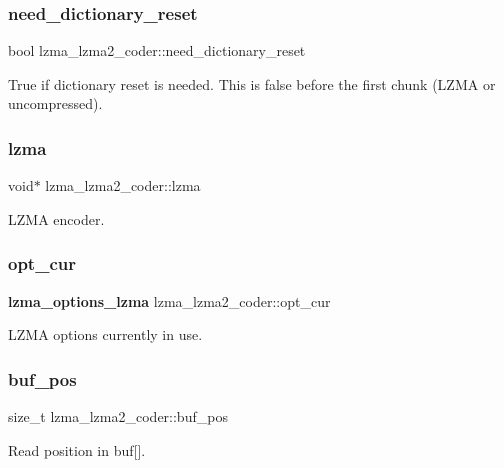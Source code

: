 \subsubsection{need\+\_\+dictionary\+\_\+reset}
{\footnotesize\ttfamily bool lzma\+\_\+lzma2\+\_\+coder\+::need\+\_\+dictionary\+\_\+reset}

True if dictionary reset is needed. This is false before the first chunk (L\+Z\+MA or uncompressed). \mbox{\label{structlzma__lzma2__coder_a9b7cc5edf67bc4bd89794a0e4f215d33}} 
\subsubsection{lzma\hspace{0.1cm}{\footnotesize\ttfamily [2/2]}}
{\footnotesize\ttfamily void$\ast$ lzma\+\_\+lzma2\+\_\+coder\+::lzma}



L\+Z\+MA encoder. 

\mbox{\label{structlzma__lzma2__coder_a83064090ed5b39899716c9e0a519098a}} 
\subsubsection{opt\+\_\+cur}
{\footnotesize\ttfamily \textbf{ lzma\+\_\+options\+\_\+lzma} lzma\+\_\+lzma2\+\_\+coder\+::opt\+\_\+cur}



L\+Z\+MA options currently in use. 

\mbox{\label{structlzma__lzma2__coder_a29b0cdea4023238f663b684331c7f83f}} 
\subsubsection{buf\+\_\+pos}
{\footnotesize\ttfamily size\+\_\+t lzma\+\_\+lzma2\+\_\+coder\+::buf\+\_\+pos}



Read position in buf[]. 

\mbox{\label{structlzma__lzma2__coder_a347c90a07f86dc0e2d48dd0578e64407}} 
